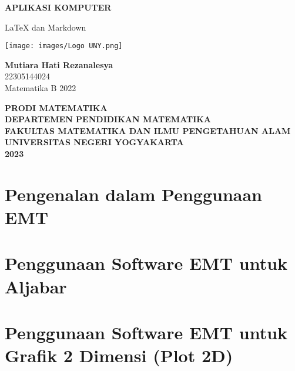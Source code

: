 \documentclass{report}
\begin{document}
\begin{titlepage}
    \begin{center}
        \vspace*{0,2cm}

        \Large
        \textbf{\huge APLIKASI KOMPUTER}
        
        \vspace{1cm}
        
        \LARGE
        LaTeX dan Markdown  
        
        \vspace{1cm}
        
        \texttt{[image: images/Logo UNY.png]}

        \vspace{1cm}
        
        \textbf{Mutiara Hati Rezanalesya}\\
        22305144024\\
        Matematika B 2022
        
        \vspace{2cm}
        
        \Large
        \textbf{PRODI MATEMATIKA}\\
        \textbf{DEPARTEMEN PENDIDIKAN MATEMATIKA}\\
        \textbf{FAKULTAS MATEMATIKA DAN ILMU PENGETAHUAN ALAM}
        \textbf{UNIVERSITAS NEGERI YOGYAKARTA}\\
        \textbf{2023}
        
    \end{center}
\end{titlepage}

\newpage
\tableofcontents

\chapter{\Large Pengenalan dalam Penggunaan EMT}


\newpage
\chapter{\Large Penggunaan Software EMT untuk Aljabar}


\newpage
\chapter{\Large Penggunaan Software EMT untuk Grafik 2 Dimensi (Plot 2D)}

\end{document}
